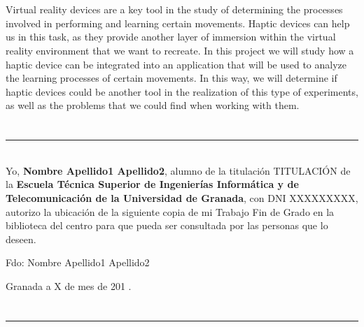 \\

\vspace{0.7cm}
\\

Virtual reality devices are a key tool in the study of determining the processes involved in performing and learning certain movements. Haptic devices can help us in this task, as they provide another layer of immersion within the virtual reality environment that we want to recreate. In this project we will study how a haptic device can be integrated into an application that will be used to analyze  the learning processes of certain movements. In this way, we will determine if haptic devices could be another tool in the realization of this type of experiments, as well as the problems that we could find when working with them.

\chapter*{}
\thispagestyle{empty}

\noindent\rule[-1ex]{\textwidth}{2pt}\\[4.5ex]

Yo, \textbf{Nombre Apellido1 Apellido2}, alumno de la titulación TITULACIÓN de la \textbf{Escuela Técnica Superior
de Ingenierías Informática y de Telecomunicación de la Universidad de Granada}, con DNI XXXXXXXXX, autorizo la
ubicación de la siguiente copia de mi Trabajo Fin de Grado en la biblioteca del centro para que pueda ser
consultada por las personas que lo deseen.

\vspace{6cm}

\noindent Fdo: Nombre Apellido1 Apellido2

\vspace{2cm}

\begin{flushright}
Granada a X de mes de 201 .
\end{flushright}


\chapter*{}
\thispagestyle{empty}

\noindent\rule[-1ex]{\textwidth}{2pt}\\[4.5ex]

